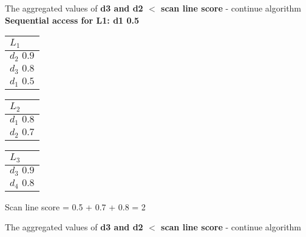 The aggregated values of\textbf{ d3 and d2 $<$ scan line score} - continue algorithm 
\\
\textbf{Sequential access for L1: d1 0.5}
 \begin{center}
    \begin{minipage}[t]{2cm}
        \begin{tabular}{|p{25pt}|}\hline
          $L_1$\\\hline
          $d_2 \, \, 0.9$\\\hline
          $d_3 \, \, 0.8$\\\hline
          $d_1 \, \, 0.5$\\\hline
        \end{tabular}
    \end{minipage}
    \hspace{5mm}
    \begin{minipage}[t]{2cm}
        \begin{tabular}{|p{25pt}|}\hline
          $L_2$\\\hline
          $d_1 \, \, 0.8$\\\hline
          $d_2 \, \, 0.7$\\\hline
            \end{tabular}
    \end{minipage}
    \hspace{5mm}
    \begin{minipage}[t]{2cm}
        \begin{tabular}{|p{25pt}|}\hline
        $L_3$\\\hline
        $d_3 \, \, 0.9$\\\hline 
        $d_4 \, \, 0.8$\\\hline
        \end{tabular}
    \end{minipage}
    \end{center}
    
Scan line score = 0.5 + 0.7 + 0.8 = 2

The aggregated values of\textbf{ d3 and d2 $<$ scan line score} - continue algorithm 

